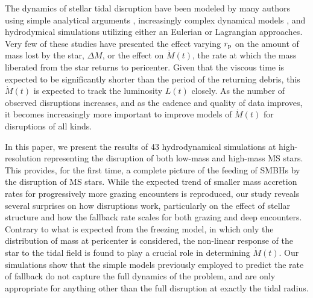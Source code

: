 \documentclass[twocolumn]{emulateapj}
\newcommand{\md}{\dot{M}\left(t\right)}
\begin{document}
The dynamics of stellar tidal disruption have been modeled by many authors using simple analytical arguments \citep{Rees:1988ei,Phinney:1989uw,Lodato:2009iba,Kasen:2010ci}, increasingly complex dynamical models \citep{Luminet:1985wz,Carter:1985ti,Luminet:1986ch,Diener:1995ui,Ivanov:2001fva}, and hydrodymical simulations utilizing either an Eulerian \citep{Evans:1989jua,Khokhlov:1993cu,Khokhlov:1993bj,Diener:1997kw,Guillochon:2009di} or Lagrangian \citep{Nolthenius:1982dn,Bicknell:1983dn,Laguna:1993cf,Kobayashi:2004kq,Rosswog:2008gc,Lodato:2009iba,RamirezRuiz:2009gw,Rosswog:2009gg,Antonini:2011ia} approaches. Very few of these studies have presented the effect varying $r_{\rm p}$ on the amount of mass lost by the star, $\Delta M$, or the effect on $\md$, the rate at which the mass liberated from the star returns to pericenter. Given that the viscous time is expected to be significantly shorter than the period of the returning debris, this $\md$ is expected to track the luminosity $L(t)$ closely. As the number of observed disruptions increases, and as the cadence and quality of data improves, it becomes increasingly more important to improve models of $\md$ for disruptions of all kinds.

In this paper, we present the results of 43 hydrodynamical simulations at high-resolution representing the disruption of both low-mass and high-mass MS stars. This provides, for the first time, a complete picture of the feeding of SMBHs by the disruption of MS stars. While the expected trend of smaller mass accretion rates for progressively more grazing encounters is reproduced, our study reveals several surprises on how disruptions work, particularly on the effect of stellar structure and how the fallback rate scales for both grazing and deep encounters. Contrary to what is expected from the freezing model, in which only the distribution of mass at pericenter is considered, the non-linear response of the star to the tidal field is found to play a crucial role in determining $\md$. Our simulations show that the simple models previously employed to predict the rate of fallback do not capture the full dynamics of the problem, and are only appropriate for anything other than the full disruption at exactly the tidal radius.
\end{document}
